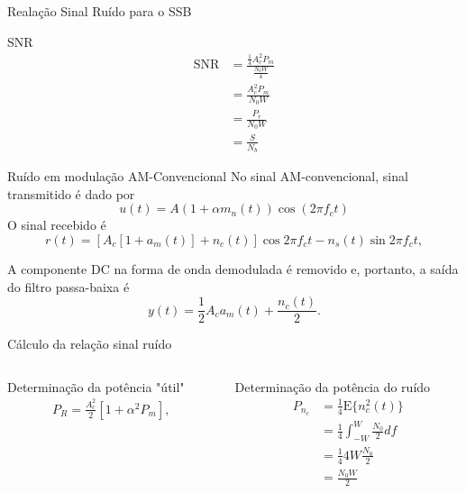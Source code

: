 \documentclass[aspectratio=169,dvipsnames]{beamer}
\begin{document}
\begin{frame}{Realação Sinal Ruído para o SSB}
    \begin{block}{SNR}
    \begin{align*}
        \textrm{SNR} &= \frac{\frac{1}{4} A^2_c P_m}{ \frac{N_0W}{4}} \\
                     &=\frac{A^2_c P_m}{ N_0W} \\
                     &=\frac{P_r}{ N_0W} \\
                     &= \frac{S}{N_b}
    \end{align*} 
\end{block}
\end{frame}


\begin{frame}{Ruído em modulação AM-Convencional}
    No sinal AM-convencional, sinal transmitido é dado por
    $$
    u(t) = A(1 + \alpha m_n(t) ) \cos (2\pi f_c t) 
    $$
    O sinal recebido é 
    $$
     r(t) = [A_c [1 + a_m(t)] + n_c(t)] \cos 2\pi f_c t - n_s(t) \sin 2\pi f_c t,
    $$

A componente DC na forma de onda demodulada é removido e, portanto, a saída do filtro passa-baixa é
    $$
    y(t) = \frac{1}{2} A_c a_m(t) + \frac{n_c(t)}{2}.
    $$
\end{frame}


\begin{frame}{Cálculo da relação sinal ruído}
\begin{columns}[T]
\begin{column}{0.5\textwidth}
Determinação da potência "útil"
\begin{align*}
  P_R = \frac{A_c^2}{2} [1 + \alpha ^2 P_{m}],
\end{align*}
\end{column}

\begin{column}{0.5\textwidth}
Determinação da potência do ruído
\begin{align*}
      P_{n_c} &= \frac{1}{4}\textrm{E}\{ n^2_c(t)\} \\
            &=  \frac{1}{4} \int _{-W}^{W} \frac{N_0}{2} df \\
            &=  \frac{1}{4} 4W \frac{N_0}{2} \\
            &= \frac{N_0W}{2}
\end{align*}
\end{column}
\end{columns}
\end{frame}
\end{document}
